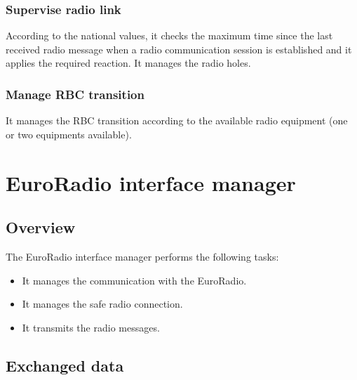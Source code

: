 \documentclass[nocc]{template/openetcs_report}
\begin{document}
\subsection{Supervise radio link}
According to the national values, it checks the maximum time since the last received radio message when a radio communication session is established and it applies the required reaction. It manages the radio holes.

\subsection{Manage RBC transition}
It manages the RBC transition according to the available radio equipment (one or two equipments available).

\chapter{EuroRadio interface manager}
\section{Overview}
The EuroRadio interface manager performs the following tasks:
\begin{itemize}
\item	It manages the communication with the EuroRadio.
\item	It manages the safe radio connection.
\item	It transmits the radio messages.
\end{itemize}
\section{Exchanged data}
\end{document}
